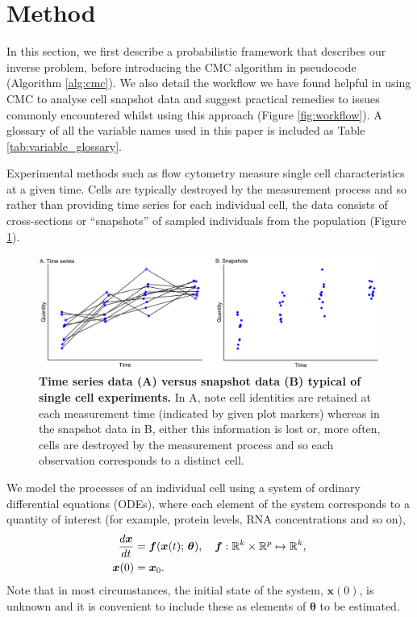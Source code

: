 \section{Method}\label{sec:method}
In this section, we first describe a probabilistic framework that describes our inverse problem, before introducing the CMC algorithm in pseudocode (Algorithm \ref{alg:cmc}). We also detail the workflow we have found helpful in using CMC to analyse cell snapshot data and suggest practical remedies to issues commonly encountered whilst using this approach (Figure \ref{fig:workflow}). A glossary of all the variable names used in this paper is included as Table \ref{tab:variable_glossary}.

Experimental methods such as flow cytometry measure single cell characteristics at a given time. Cells are typically destroyed by the measurement process and so rather than providing time series for each individual cell, the data consists of cross-sections or ``snapshots'' of sampled individuals from the population (Figure \ref{fig:time_series_v_snapshots}).

\begin{figure}[H]
	\centerline{\includegraphics[width=\textwidth]{../figures/time_series_v_snapshots.pdf}}
	\caption{\textbf{Time series data (A) versus snapshot data (B) typical of single cell experiments.} In A, note cell identities are retained at each measurement time (indicated by given plot markers) whereas in the snapshot data in B, either this information is lost or, more often, cells are destroyed by the measurement process and so each observation corresponds to a distinct cell.}
	\label{fig:time_series_v_snapshots}
\end{figure}

We model the processes of an individual cell using a system of ordinary differential equations (ODEs), where each element of the system corresponds to a quantity of interest (for example, protein levels, RNA concentrations and so on),
%
\begin{equation}\label{eq:ode}
\begin{aligned}
\frac{d\boldsymbol{x}}{dt} &= \boldsymbol{f}(\boldsymbol{x}(t); \, \boldsymbol{\theta}), \quad \boldsymbol{f}: \mathbb{R}^k \times \mathbb{R}^p \mapsto \mathbb{R}^k, \\
\boldsymbol{x}(0) &= \boldsymbol{x}_0.
\end{aligned}
\end{equation}
%
Note that in most circumstances, the initial state of the system, $\boldsymbol{x}(0)$, is unknown and it is convenient to include these as elements of $\boldsymbol{\theta}$ to be estimated.



